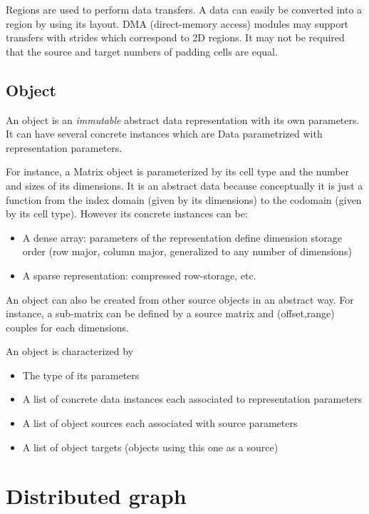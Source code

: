 \documentclass[twocolumn]{article}
\begin{document}
Regions are used to perform data transfers. A data can easily be converted into
a region by using its layout. DMA (direct-memory access) modules may support
transfers with strides which correspond to 2D regions. It may not be required
that the source and target numbers of padding cells are equal.

\subsection{Object}

An object is an \emph{immutable} abstract data representation with its own
parameters. It can have several concrete instances which are Data parametrized
with representation parameters.

For instance, a Matrix object is parameterized by its cell type and
the number and sizes of its dimensions. It is an abstract data because
conceptually it is just a function from the index domain (given by its
dimensions) to the codomain (given by its cell type). However its concrete
instances can be: 
\begin{itemize}
   \item A dense array: parameters of the representation define
dimension storage order (row major, column major, generalized to any number of
dimensions)
   \item A sparse representation: compressed row-storage, etc.
\end{itemize}

An object can also be created from other source objects in an abstract way. For
instance, a sub-matrix can be defined by a source matrix and (offset,range)
couples for each dimensions.

\begin{defin}
An object is characterized by
\begin{itemize}
   \item The type of its parameters
   \item A list of concrete data instances each associated to representation parameters
   \item A list of object sources each associated with source parameters
   \item A list of object targets (objects using this one as a source)
\end{itemize}
\end{defin}

\section{Distributed graph}
\end{document}
